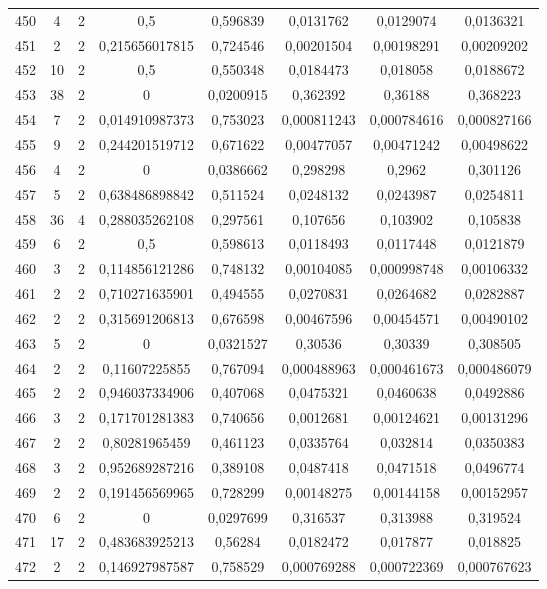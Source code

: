 \begin{longtable}{|c|c|c|c|c|c|c|c|}
450 & 4 & 2 & 0,5 & 0,596839 & 0,0131762 & 0,0129074 & 0,0136321  \\
451 & 2 & 2 & 0,215656017815 & 0,724546 & 0,00201504 & 0,00198291 & 0,00209202  \\
452 & 10 & 2 & 0,5 & 0,550348 & 0,0184473 & 0,018058 & 0,0188672  \\
453 & 38 & 2 & 0 & 0,0200915 & 0,362392 & 0,36188 & 0,368223  \\
454 & 7 & 2 & 0,014910987373 & 0,753023 & 0,000811243 & 0,000784616 & 0,000827166  \\
455 & 9 & 2 & 0,244201519712 & 0,671622 & 0,00477057 & 0,00471242 & 0,00498622  \\
456 & 4 & 2 & 0 & 0,0386662 & 0,298298 & 0,2962 & 0,301126  \\
457 & 5 & 2 & 0,638486898842 & 0,511524 & 0,0248132 & 0,0243987 & 0,0254811  \\
458 & 36 & 4 & 0,288035262108 & 0,297561 & 0,107656 & 0,103902 & 0,105838  \\
459 & 6 & 2 & 0,5 & 0,598613 & 0,0118493 & 0,0117448 & 0,0121879  \\
460 & 3 & 2 & 0,114856121286 & 0,748132 & 0,00104085 & 0,000998748 & 0,00106332  \\
461 & 2 & 2 & 0,710271635901 & 0,494555 & 0,0270831 & 0,0264682 & 0,0282887  \\
462 & 2 & 2 & 0,315691206813 & 0,676598 & 0,00467596 & 0,00454571 & 0,00490102  \\
463 & 5 & 2 & 0 & 0,0321527 & 0,30536 & 0,30339 & 0,308505  \\
464 & 2 & 2 & 0,11607225855 & 0,767094 & 0,000488963 & 0,000461673 & 0,000486079  \\
465 & 2 & 2 & 0,946037334906 & 0,407068 & 0,0475321 & 0,0460638 & 0,0492886  \\
466 & 3 & 2 & 0,171701281383 & 0,740656 & 0,0012681 & 0,00124621 & 0,00131296  \\
467 & 2 & 2 & 0,80281965459 & 0,461123 & 0,0335764 & 0,032814 & 0,0350383  \\
468 & 3 & 2 & 0,952689287216 & 0,389108 & 0,0487418 & 0,0471518 & 0,0496774  \\
469 & 2 & 2 & 0,191456569965 & 0,728299 & 0,00148275 & 0,00144158 & 0,00152957  \\
470 & 6 & 2 & 0 & 0,0297699 & 0,316537 & 0,313988 & 0,319524  \\
471 & 17 & 2 & 0,483683925213 & 0,56284 & 0,0182472 & 0,017877 & 0,018825  \\
472 & 2 & 2 & 0,146927987587 & 0,758529 & 0,000769288 & 0,000722369 & 0,000767623  \\

\end{longtable}
